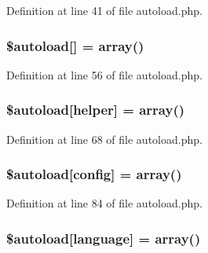 Definition at line 41 of file autoload.\+php.

\subsubsection[{\texorpdfstring{\$autoload}{$autoload}}]{\setlength{\rightskip}{0pt plus 5cm}\$autoload\mbox{[}\textquotesingle{}\mbox{]} = array()}\hypertarget{autoload_8php_ab86d0a1a62e12b528eacaa7100bc4d93}{}\label{autoload_8php_ab86d0a1a62e12b528eacaa7100bc4d93}


Definition at line 56 of file autoload.\+php.

\subsubsection[{\texorpdfstring{\$autoload}{$autoload}}]{\setlength{\rightskip}{0pt plus 5cm}\$autoload\mbox{[}\textquotesingle{}helper\textquotesingle{}\mbox{]} = array()}\hypertarget{autoload_8php_aa98014ce8ad854ad9500e65ff159272d}{}\label{autoload_8php_aa98014ce8ad854ad9500e65ff159272d}


Definition at line 68 of file autoload.\+php.

\subsubsection[{\texorpdfstring{\$autoload}{$autoload}}]{\setlength{\rightskip}{0pt plus 5cm}\$autoload\mbox{[}\textquotesingle{}config\textquotesingle{}\mbox{]} = array()}\hypertarget{autoload_8php_ac051887e192979c0320e05821bad8f33}{}\label{autoload_8php_ac051887e192979c0320e05821bad8f33}


Definition at line 84 of file autoload.\+php.

\subsubsection[{\texorpdfstring{\$autoload}{$autoload}}]{\setlength{\rightskip}{0pt plus 5cm}\$autoload\mbox{[}\textquotesingle{}language\textquotesingle{}\mbox{]} = array()}\hypertarget{autoload_8php_addfee4f4b38a8235172cb173995a9c0b}{}\label{autoload_8php_addfee4f4b38a8235172cb173995a9c0b}


